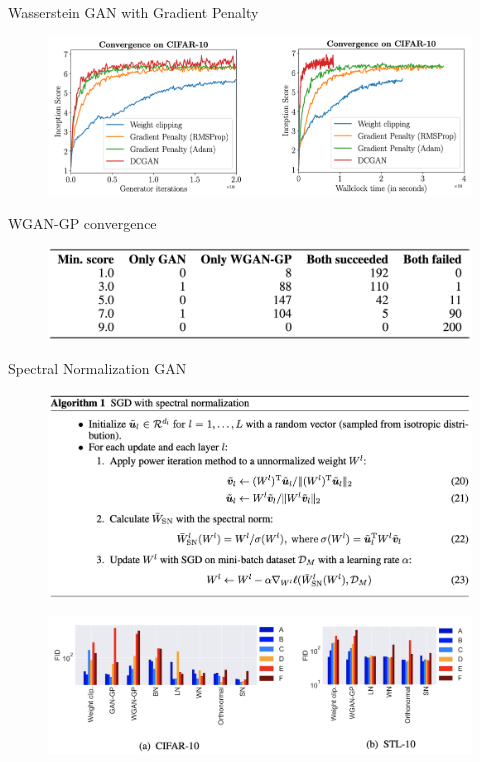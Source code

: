 \begin{frame}{Wasserstein GAN with Gradient Penalty}
	\begin{figure}
		\centering
		\includegraphics[width=\linewidth]{figs/wgan_gp_convergence}
	\end{figure}
	\begin{block}{WGAN-GP convergence}
		\begin{figure}
			\centering
			\includegraphics[width=0.75\linewidth]{figs/wgan_gp_wgan}
		\end{figure}
	\end{block}
	
\end{frame}
\begin{frame}{Spectral Normalization GAN}
	\begin{figure}
		\centering
		\includegraphics[width=0.85\linewidth]{figs/sngan_pseudocode}
	\end{figure}
	\begin{figure}
		\centering
		\includegraphics[width=0.85\linewidth]{figs/sngan_fids}
	\end{figure}
	
\end{frame}

